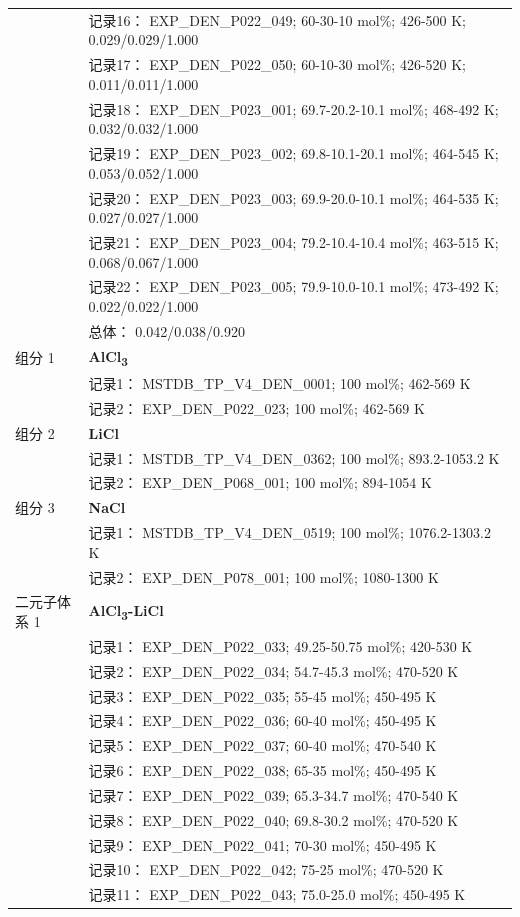 \documentclass[12pt]{article}
\begin{document}
{\begin{longtable}[]{@{}
  >{\raggedright\arraybackslash}p{}
  >{\raggedright\arraybackslash}p{}@{}}
 & 记录16： EXP\_DEN\_P022\_049; 60-30-10 mol\%; 426-500 K; 0.029/0.029/1.000 \\
 & 记录17： EXP\_DEN\_P022\_050; 60-10-30 mol\%; 426-520 K; 0.011/0.011/1.000 \\
 & 记录18： EXP\_DEN\_P023\_001; 69.7-20.2-10.1 mol\%; 468-492 K; 0.032/0.032/1.000 \\
 & 记录19： EXP\_DEN\_P023\_002; 69.8-10.1-20.1 mol\%; 464-545 K; 0.053/0.052/1.000 \\
 & 记录20： EXP\_DEN\_P023\_003; 69.9-20.0-10.1 mol\%; 464-535 K; 0.027/0.027/1.000 \\
 & 记录21： EXP\_DEN\_P023\_004; 79.2-10.4-10.4 mol\%; 463-515 K; 0.068/0.067/1.000 \\
 & 记录22： EXP\_DEN\_P023\_005; 79.9-10.0-10.1 mol\%; 473-492 K; 0.022/0.022/1.000 \\
 & 总体： 0.042/0.038/0.920  \\

组分 1  & \textbf{AlCl\textsubscript{3}} \\
 & 记录1： MSTDB\_TP\_V4\_DEN\_0001; 100 mol\%; 462-569 K \\
 & 记录2： EXP\_DEN\_P022\_023; 100 mol\%; 462-569 K  \\

组分 2  & \textbf{LiCl} \\
 & 记录1： MSTDB\_TP\_V4\_DEN\_0362; 100 mol\%; 893.2-1053.2 K \\
 & 记录2： EXP\_DEN\_P068\_001; 100 mol\%; 894-1054 K  \\

组分 3  & \textbf{NaCl} \\
 & 记录1： MSTDB\_TP\_V4\_DEN\_0519; 100 mol\%; 1076.2-1303.2 K \\
 & 记录2： EXP\_DEN\_P078\_001; 100 mol\%; 1080-1300 K  \\

二元子体系 1  & \textbf{AlCl\textsubscript{3}-LiCl} \\
 & 记录1： EXP\_DEN\_P022\_033; 49.25-50.75 mol\%; 420-530 K \\
 & 记录2： EXP\_DEN\_P022\_034; 54.7-45.3 mol\%; 470-520 K \\
 & 记录3： EXP\_DEN\_P022\_035; 55-45 mol\%; 450-495 K \\
 & 记录4： EXP\_DEN\_P022\_036; 60-40 mol\%; 450-495 K \\
 & 记录5： EXP\_DEN\_P022\_037; 60-40 mol\%; 470-540 K \\
 & 记录6： EXP\_DEN\_P022\_038; 65-35 mol\%; 450-495 K \\
 & 记录7： EXP\_DEN\_P022\_039; 65.3-34.7 mol\%; 470-540 K \\
 & 记录8： EXP\_DEN\_P022\_040; 69.8-30.2 mol\%; 470-520 K \\
 & 记录9： EXP\_DEN\_P022\_041; 70-30 mol\%; 450-495 K \\
 & 记录10： EXP\_DEN\_P022\_042; 75-25 mol\%; 470-520 K \\
 & 记录11： EXP\_DEN\_P022\_043; 75.0-25.0 mol\%; 450-495 K  \\


\end{longtable}}
\end{document}
